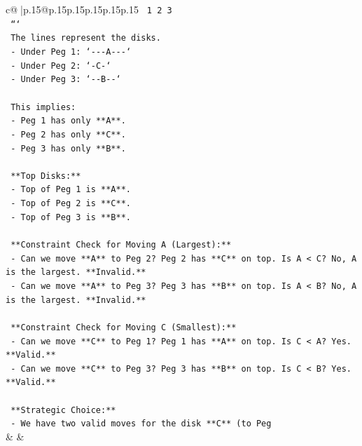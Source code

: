 \documentclass{article}
\begin{document}
{\begin{supertabular}{c@{$\;$}|p{.15\linewidth}@{}p{.15\linewidth}p{.15\linewidth}p{.15\linewidth}p{.15\linewidth}p{.15\linewidth}}
{{{\texttt{     1       2       3  } \\
\texttt{  ```} \\
\texttt{  The lines represent the disks.} \\
\texttt{  {-} Under Peg 1: `{-}{-}{-}A{-}{-}{-}`} \\
\texttt{  {-} Under Peg 2: `{-}C{-}`} \\
\texttt{  {-} Under Peg 3: `{-}{-}B{-}{-}`} \\
\\ 
\texttt{  This implies:} \\
\texttt{  {-} Peg 1 has only **A**.} \\
\texttt{  {-} Peg 2 has only **C**.} \\
\texttt{  {-} Peg 3 has only **B**.} \\
\\ 
\texttt{  **Top Disks:**} \\
\texttt{  {-} Top of Peg 1 is **A**.} \\
\texttt{  {-} Top of Peg 2 is **C**.} \\
\texttt{  {-} Top of Peg 3 is **B**.} \\
\\ 
\texttt{  **Constraint Check for Moving A (Largest):**} \\
\texttt{  {-} Can we move **A** to Peg 2? Peg 2 has **C** on top. Is A < C? No, A is the largest. **Invalid.**} \\
\texttt{  {-} Can we move **A** to Peg 3? Peg 3 has **B** on top. Is A < B? No, A is the largest. **Invalid.**} \\
\\ 
\texttt{  **Constraint Check for Moving C (Smallest):**} \\
\texttt{  {-} Can we move **C** to Peg 1? Peg 1 has **A** on top. Is C < A? Yes. **Valid.**} \\
\texttt{  {-} Can we move **C** to Peg 3? Peg 3 has **B** on top. Is C < B? Yes. **Valid.**} \\
\\ 
\texttt{  **Strategic Choice:**} \\
\texttt{  {-} We have two valid moves for the disk **C** (to Peg} \\
            }
        }
    }
    & & \\ \\


\end{supertabular}}
\end{document}
